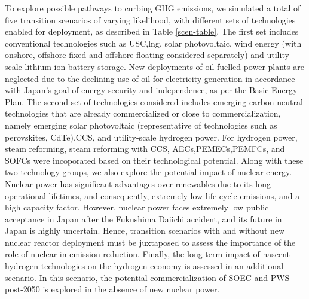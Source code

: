 To explore possible pathways to curbing \gls{GHG} emissions, we simulated a total of five transition scenarios of varying likelihood, with different sets of technologies enabled for deployment, as described in Table \ref{scen-table}. The first set includes conventional technologies such as  \gls{USC},\gls{lng}, solar photovoltaic, wind energy (with onshore, offshore-fixed and offshore-floating considered separately) and utility-scale lithium-ion battery storage. New deployments of oil-fuelled power plants are neglected due to the declining use of oil for electricity generation in accordance with Japan's goal of energy security and independence, as per the Basic Energy Plan. The second set of technologies considered includes emerging carbon-neutral technologies that are already commercialized or close to commercialization, namely emerging solar photovoltaic (representative of technologies such as perovskites, CdTe),\gls{CCS}, and utility-scale hydrogen power. For hydrogen power, steam reforming, steam reforming with \gls{CCS}, \gls{AEC}s,\gls{PEMEC}s,\gls{PEMFC}s, and \gls{SOFC}s were incoporated based on their technological potential. Along with these two technology groups, we also explore the potential impact of nuclear energy. Nuclear power has significant advantages over renewables due to its long operational lifetimes, and consequently, extremely low life-cycle emissions, and a high capacity factor. However, nuclear power faces extremely low public acceptance in Japan after the Fukushima Daiichi accident, and its future in Japan is highly uncertain. Hence, transition scenarios with and without new nuclear reactor deployment must be juxtaposed to assess the importance of the role of nuclear in emission reduction. Finally, the long-term impact of nascent hydrogen technologies on the hydrogen economy is assessed in an additional scenario. In this scenario, the potential commercialization of \gls{SOEC} and \gls{PWS} post-2050 is explored in the absence of new nuclear power.

